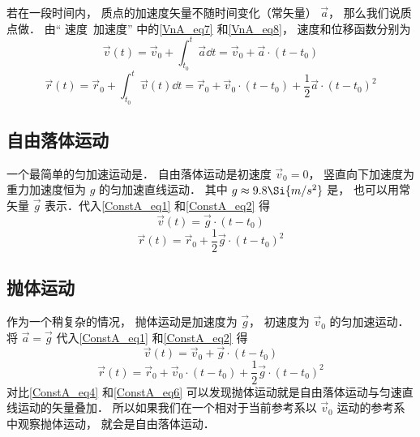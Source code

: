 

若在一段时间内， 质点的加速度矢量不随时间变化（常矢量） $\vec a$， 那么我们说质点做． 由“ 速度\ 加速度” 中的\autoref{VnA_eq7} 和\autoref{VnA_eq8}， 速度和位移函数分别为
\begin{equation}\label{ConstA_eq1}
\vec v(t) = \vec v_0 + \int_{t_0}^{t} \vec a \dd{t} = \vec v_0 + \vec a \cdot (t-t_0)
\end{equation}
\begin{equation}\label{ConstA_eq2}
\vec r(t) = \vec r_0 + \int_{t_0}^{t} \vec v(t) \dd{t} = \vec r_0 + \vec v_0\cdot (t-t_0) + \frac12 \vec a\cdot (t-t_0)^2
\end{equation}




\subsection{自由落体运动}
一个最简单的匀加速运动是． 自由落体运动是初速度 $\vec v_0 = 0$， 竖直向下加速度为重力加速度恒为 $g$ 的匀加速直线运动． 其中 $g\approx 9.8\Si{m/s^2}$ 是， 也可以用常矢量 $\vec g$ 表示．代入\autoref{ConstA_eq1} 和\autoref{ConstA_eq2} 得
\begin{equation}\label{ConstA_eq3}
\vec v(t) = \vec g \cdot (t-t_0)
\end{equation}
\begin{equation}\label{ConstA_eq4}
\vec r(t) = \vec r_0 + \frac12 \vec g \cdot (t-t_0)^2
\end{equation}

\subsection{抛体运动}
作为一个稍复杂的情况， 抛体运动是加速度为 $\vec g$， 初速度为 $\vec v_0$ 的匀加速运动． 将 $\vec a = \vec g$ 代入\autoref{ConstA_eq1} 和\autoref{ConstA_eq2} 得
\begin{equation}\label{ConstA_eq5}
\vec v(t) = \vec v_0 + \vec g \cdot (t-t_0)
\end{equation}
\begin{equation}\label{ConstA_eq6}
\vec r(t) = \vec r_0 + \vec v_0\cdot (t-t_0) + \frac12 \vec g\cdot (t-t_0)^2
\end{equation}
对比\autoref{ConstA_eq4} 和\autoref{ConstA_eq6} 可以发现抛体运动就是自由落体运动与匀速直线运动的矢量叠加． 所以如果我们在一个相对于当前参考系以 $\vec v_0$ 运动的参考系中观察抛体运动， 就会是自由落体运动．

